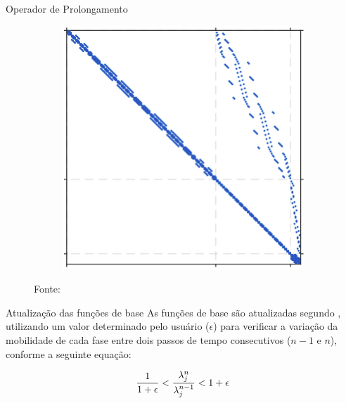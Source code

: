 \documentclass[professionalfont]{beamer}
\begin{document}
\begin{frame}{Operador de Prolongamento}
\begin{figure}[!ht]
\begin{subfigure}{.3\textwidth}
            \subcaption{\finewirebasketMatrix}
            \label{fig:multiescala.4.b}
        \end{subfigure}
        \begin{subfigure}{.3\textwidth}
            \centering
            \includegraphics[scale=0.27]{./imgs/im12.png}
            \subcaption{$\finewirebasketMatrixMod$}
            \label{fig:multiescala.4.c}
        \end{subfigure}
        
        {\footnotesize Fonte:\cite{Magri2015}}
        \label{fig:multiescala.4}
    \end{figure}

\end{frame}

\begin{frame}{Atualização das funções de base}
    As funções de base são atualizadas segundo , utilizando um valor determinado pelo usuário ($\epsilon$) para verificar a variação da mobilidade de cada fase entre dois passos de tempo consecutivos ($n-1$ e $n$), conforme a seguinte equação:

\begin{equation}
    \dfrac{1}{1+\epsilon} < \dfrac{\lambda_{j}^{n}}{\lambda_{j}^{n-1}}  < 1 + \epsilon  
    \label{eq:update_bf.1}
\end{equation}
\end{frame}
\end{document}
